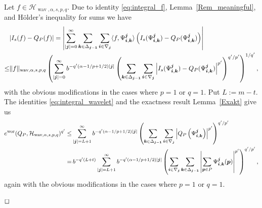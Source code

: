\documentclass[12pt]{article}
\DeclareMathOperator{\wav}{wav}
\DeclareMathOperator{\wor}{wor}
\newenvironment{proof}{\begin{trivlist}
    \item[\hskip\labelsep{\it Proof.}]}{$\hfill\Box$\end{trivlist}}
\newcommand{\bsk}{\boldsymbol{k}}
\newcommand{\bsi}{\boldsymbol{i}}
\newcommand{\bsj}{\boldsymbol{j}}
\newcommand{\bsp}{\boldsymbol{p}}
\newcommand{\HH}{\mathcal{H}}
\begin{document}
\begin{proof}
Let $f\in \HH_{\wav,\alpha,s,p,q}$. Due to identity \eqref{eq:integral_f}, Lemma~\ref{Rem_meaningful}, and H\"older's inequality for sums we have
\begin{equation*}
\begin{split}
&|I_s(f) - Q_{P}(f)| =
\left| \sum^\infty_{|\bsj|=0} \sum_{\bsk\in\Delta_{\bsj-{\bf 1}}}
\sum_{\bsi \in \nabla_{\bsj}}\langle f, \Psi^{\bsj}_{\bsi,\bsk}
\rangle
\left( I_s(\Psi^{\bsj}_{\bsi,\bsk}) - Q_{P}(\Psi^{\bsj}_{\bsi,\bsk})
\right) \right|\\
\le &\|f\|_{\wav,\alpha,s,p,q} \left( \sum^\infty_{|\bsj|=0}
b^{-q'(\alpha-1/p+1/2) |\bsj|}
\left( \sum_{\bsk\in\Delta_{\bsj-{\bf 1}}} \sum_{\bsi\in\nabla_{\bsj}}
\left| I_s(\Psi^{\bsj}_{\bsi,\bsk}) - Q_{P}(\Psi^{\bsj}_{\bsi,\bsk})
\right|^{p'} \right)^{q'/p'} \right)^{1/q'},
\end{split}
\end{equation*}
with the obvious modifications in the cases where $p=1$ or $q=1$.
Put $L:=m-t$.
The identities \eqref{eq:integral_wavelet} and the exactness result Lemma~\ref{Exakt} give us
\begin{equation*}
\begin{split}
e^{\wor}(Q_P, \HH_{\wav,\alpha,s,p,q})^{q'}
\le& \sum^\infty_{|\bsj|=L+1} b^{-q'(\alpha-1/p+1/2) |\bsj|}
\left( \sum_{\bsk\in\Delta_{\bsj-{\bf 1}}} \sum_{\bsi\in\nabla_{\bsj}}
 \left|Q_{P} \left(\Psi^{\bsj}_{\bsi,\bsk}
\right) \right|^{p'} \right)^{q'/p'}\\
=&\, b^{-q'(L+t)} \sum^\infty_{|\bsj|=L+1} b^{-q'(\alpha-1/p+1/2)|\bsj|}
\left( \sum_{\bsi\in\nabla_{\bsj}}\sum_{\bsk\in\Delta_{\bsj-{\bf 1}}}
\left| \sum_{\bsp\in P}
\Psi^{\bsj}_{\bsi,\bsk}(\bsp) \right|^{p'} \right)^{q'/p'},
\end{split}
\end{equation*}
again with the obvious modifications in the cases where $p=1$ or $q=1$.


\end{proof}
\end{document}
